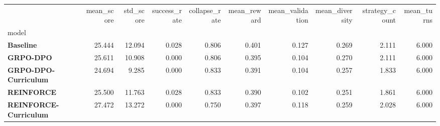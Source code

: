 \begin{tabular}{lrrrrrrrrr}
\toprule
 & mean_score & std_score & success_rate & collapse_rate & mean_reward & mean_validation & mean_diversity & strategy_count & mean_turns \\
model &  &  &  &  &  &  &  &  &  \\
\midrule
\textbf{Baseline} & 25.444 & 12.094 & 0.028 & 0.806 & 0.401 & 0.127 & 0.269 & 2.111 & 6.000 \\
\textbf{GRPO-DPO} & 25.611 & 10.908 & 0.000 & 0.806 & 0.395 & 0.104 & 0.270 & 2.111 & 6.000 \\
\textbf{GRPO-DPO-Curriculum} & 24.694 & 9.285 & 0.000 & 0.833 & 0.391 & 0.104 & 0.257 & 1.833 & 6.000 \\
\textbf{REINFORCE} & 25.500 & 11.763 & 0.028 & 0.833 & 0.390 & 0.102 & 0.251 & 1.861 & 6.000 \\
\textbf{REINFORCE-Curriculum} & 27.472 & 13.272 & 0.000 & 0.750 & 0.397 & 0.118 & 0.259 & 2.028 & 6.000 \\
\bottomrule
\end{tabular}
